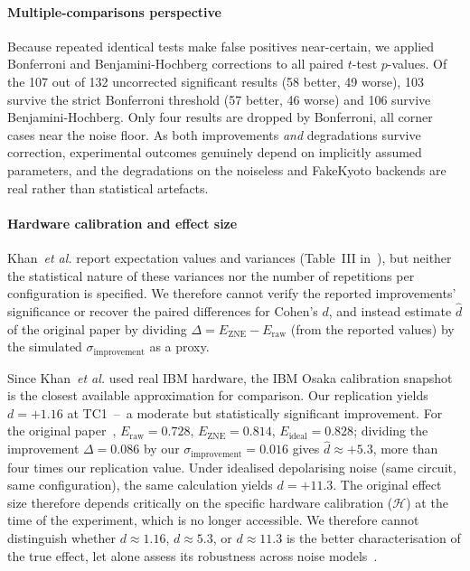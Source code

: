 \documentclass[10pt,conference]{IEEEtran}
\newcommand{\etal}{\emph{et al.}\xspace}
\begin{document}
\paragraph{Multiple-comparisons perspective}
Because repeated identical tests make false positives near-certain, we applied Bonferroni and Benjamini-Hochberg corrections to all paired $t$-test $p$-values. Of the 107 out of 132 uncorrected significant results (58 better, 49 worse), 103 survive the strict Bonferroni threshold (57 better, 46 worse) and 106 survive Benjamini-Hochberg. Only four results are dropped by Bonferroni, all corner cases near the noise floor. As both improvements \emph{and} degradations survive correction, experimental outcomes genuinely depend on implicitly assumed parameters, and the degradations on the noiseless and FakeKyoto backends are real rather than statistical artefacts.

\paragraph{Hardware calibration and effect size}
Khan~\etal report expectation values and variances (Table~III in~\cite{khan_error_2024}), but neither the statistical nature of these variances nor the number of repetitions per configuration is specified. We therefore cannot verify the reported improvements' significance or recover the paired differences for Cohen's $d$, and instead estimate $\hat{d}$ of the original paper by dividing $\Delta = E_\text{ZNE} - E_\text{raw}$ (from the reported values) by the simulated $\sigma_\text{improvement}$ as a proxy.

Since Khan~\etal used real IBM hardware, the IBM Osaka calibration snapshot is the closest available approximation for comparison. Our replication yields $d = +1.16$ at TC1~--~a moderate but statistically significant improvement. For the original paper~\cite{khan_error_2024}, $E_\text{raw} = 0.728$, $E_\text{ZNE} = 0.814$, $E_\text{ideal} = 0.828$; dividing the improvement $\Delta = 0.086$ by our $\sigma_\text{improvement} = 0.016$ gives $\hat{d} \approx +5.3$, more than four times our replication value. Under idealised depolarising noise (same circuit, same configuration), the same calculation yields $d = +11.3$. The original effect size therefore depends critically on the specific hardware calibration ($\mathcal{H}$) at the time of the experiment, which is no longer accessible. We therefore cannot distinguish whether $d\approx 1.16$, $d\approx 5.3$, or $d\approx 11.3$ is the better characterisation of the true effect, let alone assess its robustness across noise models~\cite{senapati_towards_2023,zheng_bayesian_2023}.
\end{document}

